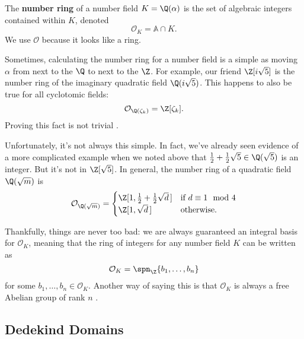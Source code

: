 \begin{definition}
    The \textbf{number ring} of a number field $K = \Q(\alpha)$ is the set of algebraic integers contained within $K$, denoted
    \begin{equation*}
        \mathcal O_K = \mathbb A \cap K.
    \end{equation*}
    We use $\mathcal O$ because it looks like a ring.
\end{definition}

Sometimes, calculating the number ring for a number field is a simple as moving $\alpha$ from next to the $\Q$ to next to the $\Z$. For example, our friend $\Z[i \sqrt 5]$ is the number ring of the imaginary quadratic field $\Q(i \sqrt{5})$. This happens to also be true for all cyclotomic fields:
\begin{equation}
    \mathcal O_{\Q(\zeta_k)} = \Z[\zeta_k].
\end{equation}
Proving this fact is not trivial \cite[22]{marcus}.

Unfortunately, it's not always this simple. In fact, we've already seen evidence of a more complicated example when we noted above that $\frac12 + \frac12 \sqrt 5 \in \Q(\sqrt 5)$ is an integer. But it's not in $\Z[\sqrt 5]$. In general, the number ring of a quadratic field $\Q(\sqrt m)$ is
\begin{equation}
    \mathcal O_{\Q(\sqrt m)} = \begin{cases}
        \Z[1, \frac12 + \frac12 \sqrt d \, ] & \text{if $d \equiv 1 \mod 4$} \\
        \Z[1, \sqrt d \, ]                   & \text{otherwise}.
    \end{cases}
\end{equation}

Thankfully, things are never too bad: we are always guaranteed an integral basis for $\mathcal O_K$, meaning that the ring of integers for any number field $K$ can be written as
\begin{equation}
    \mathcal O_K = \spn_\Z \{ b_1, \ldots, b_n \}
\end{equation}
for some $b_1, \ldots, b_n \in \mathcal O_K$. Another way of saying this is that $\mathcal O_K$ is always a free Abelian group of rank $n$ \cite[20]{marcus}.

\subsection{Dedekind Domains}

